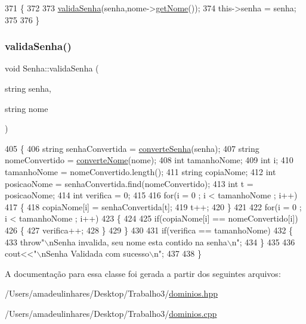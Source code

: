 \begin{DoxyCode}
371 \{
372 
373     \mbox{\hyperlink{class_senha_a5c87578fbe77800cee8c8f51d7a06d17}{validaSenha}}(senha,nome->\mbox{\hyperlink{class_nome_aad41176173eec20cbbae1576447a3697}{getNome}}());
374     this->senha = senha;
375 
376 \}
\end{DoxyCode}
\mbox{\label{class_senha_a5c87578fbe77800cee8c8f51d7a06d17}} 
\subsubsection{\texorpdfstring{valida\+Senha()}{validaSenha()}}
{\footnotesize\ttfamily void Senha\+::valida\+Senha (\begin{DoxyParamCaption}\item[{string}]{senha,  }\item[{string}]{nome }\end{DoxyParamCaption})}


\begin{DoxyCode}
405 \{
406  \textcolor{keywordtype}{string} senhaConvertida = \mbox{\hyperlink{class_senha_a64d982211a22299b77487531bdc18e1f}{converteSenha}}(senha);
407  \textcolor{keywordtype}{string} nomeConvertido = \mbox{\hyperlink{class_senha_a39b73424d487b79e150b97400585e78b}{converteNome}}(nome);
408  \textcolor{keywordtype}{int} tamanhoNome;
409  \textcolor{keywordtype}{int} i;
410  tamanhoNome = nomeConvertido.length();
411  \textcolor{keywordtype}{string} copiaNome;
412  \textcolor{keywordtype}{int} posicaoNome = senhaConvertida.find(nomeConvertido);
413  \textcolor{keywordtype}{int} t = posicaoNome;
414  \textcolor{keywordtype}{int} verifica = 0;
415 
416  \textcolor{keywordflow}{for}(i = 0 ; i < tamanhoNome ; i++)
417  \{
418    copiaNome[i] = senhaConvertida[t];
419    t++;
420  \}
421 
422  \textcolor{keywordflow}{for}(i = 0 ; i < tamanhoNome ; i++)
423  \{
424 
425    \textcolor{keywordflow}{if}(copiaNome[i] == nomeConvertido[i])
426    \{
427      verifica++;
428    \}
429  \}
430 
431  \textcolor{keywordflow}{if}(verifica == tamanhoNome)
432  \{
433    \textcolor{keywordflow}{throw}\textcolor{stringliteral}{"\(\backslash\)nSenha invalida, seu nome esta contido na senha\(\backslash\)n"};
434  \}
435 
436  cout<<\textcolor{stringliteral}{"\(\backslash\)nSenha Validada com sucesso\(\backslash\)n"};
437 
438 \}
\end{DoxyCode}


A documentação para essa classe foi gerada a partir dos seguintes arquivos\+:\begin{DoxyCompactItemize}
\item 
/\+Users/amadeulinhares/\+Desktop/\+Trabalho3/\mbox{\hyperlink{dominios_8hpp}{dominios.\+hpp}}\item 
/\+Users/amadeulinhares/\+Desktop/\+Trabalho3/\mbox{\hyperlink{dominios_8cpp}{dominios.\+cpp}}\end{DoxyCompactItemize}
